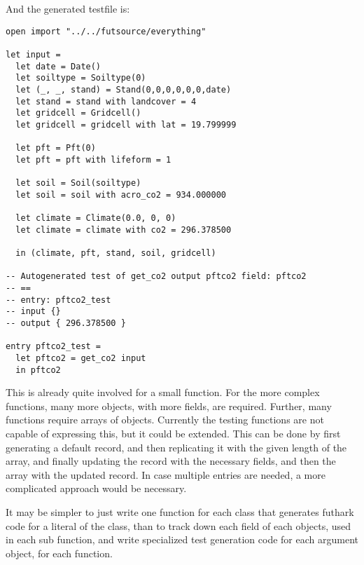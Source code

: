 And the generated testfile is:

\begin{verbatim}
open import "../../futsource/everything"

let input =
  let date = Date()
  let soiltype = Soiltype(0)
  let (_, _, stand) = Stand(0,0,0,0,0,0,date)
  let stand = stand with landcover = 4
  let gridcell = Gridcell()
  let gridcell = gridcell with lat = 19.799999

  let pft = Pft(0)
  let pft = pft with lifeform = 1

  let soil = Soil(soiltype)
  let soil = soil with acro_co2 = 934.000000

  let climate = Climate(0.0, 0, 0)
  let climate = climate with co2 = 296.378500

  in (climate, pft, stand, soil, gridcell)

-- Autogenerated test of get_co2 output pftco2 field: pftco2
-- ==
-- entry: pftco2_test
-- input {}
-- output { 296.378500 }

entry pftco2_test =
  let pftco2 = get_co2 input
  in pftco2
\end{verbatim}

This is already quite involved for a small function. For the more complex functions, many more objects, with more fields, are required. Further, many functions require arrays of objects. Currently the testing functions are not capable of expressing this, but it could be extended. This can be done by first generating a default record, and then replicating it with the given length of the array, and finally updating the record with the necessary fields, and then the array with the updated record. In case multiple entries are needed, a more complicated approach would be necessary.

It may be simpler to just write one function for each class that generates futhark code for a literal of the class, than to track down each field of each objects, used in each sub function, and write specialized test generation code for each argument object, for each function.
